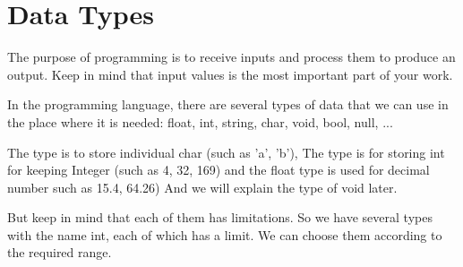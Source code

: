 \documentclass[11pt,fleqn]{book}
\begin{document}
\section{Data Types}


The purpose of programming is to receive inputs and process them to produce an output.
Keep in mind that input values is the most important part of your work.


In the programming language, there are several types of data that we can use in the place where it is needed:
float, int, string, char, void, bool, null, ...

The type is to store individual char (such as 'a', 'b'), The type is for storing int for keeping Integer (such as 4, 32, 169) and the float type is used for decimal number such as 15.4, 64.26) And we will explain the type of void later.

But keep in mind that each of them has limitations.
So we have several types with the name int, each of which has a limit.
We can choose them according to the required range.

\pagebreak
\end{document}
